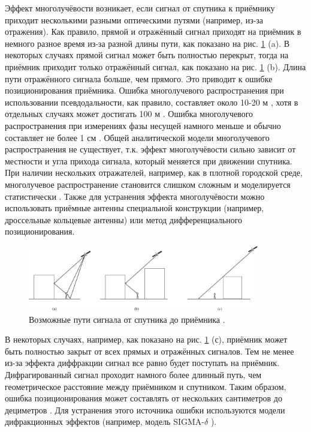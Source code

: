 Эффект многолучёвости возникает, если сигнал от спутника к приёмнику приходит несколькими разными оптическими путями (например, из-за отражения).
Как правило, прямой и отражённый сигнал приходят на приёмник в немного разное время из-за разной длины пути, как показано на рис. \ref{fig-signal-paths} (a).
В некоторых случаях прямой сигнал может быть полностью перекрыт, тогда на приёмник приходит только отражённый сигнал, как показано на рис. \ref{fig-signal-paths} (b).
Длина пути отражённого сигнала больше, чем прямого.
Это приводит к ошибке позиционирования приёмника.
Ошибка многолучевого распространения при использовании псевдодальности, как правило, составляет около 10-20 м \cite{Wells1987}, хотя в отдельных случаях может достигать 100 м \cite{VanNee1992}.
Ошибка многолучевого распространения при измерениях фазы несущей намного меньше и обычно составляет не более 1 см \cite{Hofmann2008}. 
Общей аналитической модели многолучевого распространения не существует, т.к. эффект многолучёвости сильно зависит от местности и угла прихода сигнала, который меняется при движении спутника. 
При наличии нескольких отражателей, например, как в плотной городской среде, многолучевое распространение становится слишком сложным и моделируется статистически \cite{Rappaport2002}. 
Также для устранения эффекта многолучёвости можно использовать приёмные антенны специальной конструкции (например, дроссельные кольцевые антенны) или метод дифференциального позиционирования.
\begin{figure}[h]
\centering    
\includegraphics[width=0.9\textwidth]{fig/signal-paths.png}    
\caption{Возможные пути сигнала от спутника до приёмника \cite{Seeber2003}.}
\label{fig-signal-paths}      
\end{figure}

В некоторых случаях, например, как показано на рис. \ref{fig-signal-paths} (с), приёмник может быть полностью закрыт от всех прямых и отражённых сигналов.
Тем не менее из-за эффекта диффракции сигнал все равно будет поступать на приёмник.
Дифрагированный сигнал проходит намного более длинный путь, чем геометрическое расстояние между приёмником и спутником.
Таким образом, ошибка позиционирования может составлять от нескольких сантиметров до дециметров \cite{Seeber2003}.
Для устранения этого источника ошибки используются модели дифракционных эффектов (например, модель SIGMA-$\delta$ \cite{Brunner1999}).

